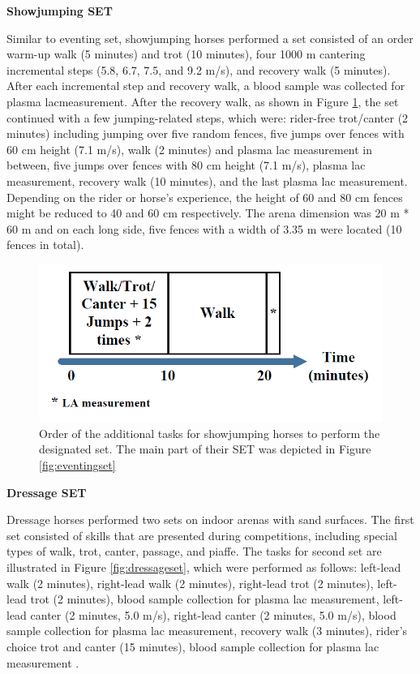 \vspace{5pt}
{\noindent\textbf{Showjumping SET} \par}
Similar to eventing \gls{set}, showjumping horses performed a \gls{set} consisted of an order warm-up walk (5 minutes) and trot (10 minutes), four 1000 m cantering incremental steps (5.8, 6.7, 7.5, and 9.2 m/s), and recovery walk (5 minutes). After each incremental step and recovery walk, a blood sample was collected for plasma \gls{lac}measurement. After the recovery walk, as shown in Figure \ref{fig:showjumpingset}, the \gls{set} continued with a few jumping-related steps, which were: rider-free trot/canter (2 minutes) including jumping over five random fences, five jumps over fences with 60 cm height (7.1 m/s), walk (2 minutes) and plasma \gls{lac} measurement in between, five jumps over fences with 80 cm height (7.1 m/s), plasma \gls{lac} measurement, recovery walk (10 minutes), and the last plasma \gls{lac} measurement. Depending on the rider or horse's experience, the height of 60 and 80 cm fences might be reduced to 40 and 60 cm respectively. The arena dimension was 20 m * 60 m and on each long side, five fences with a width of 3.35 m were located (10 fences in total).



\begin{figure}[!htbp]
\centering
\includegraphics[scale=0.3]{chapters/data/figures/ShowjumpingSET.png}
\caption{Order of the additional tasks for showjumping horses to perform the designated \gls{set}. The main part of their SET was depicted in Figure \ref{fig:eventingset}}
\label{fig:showjumpingset}
\end{figure}

\vspace{5pt}
{\noindent\textbf{Dressage SET} \par}
Dressage horses performed two \gls{set}s on indoor arenas with sand surfaces. The first \gls{set} consisted of skills that are presented during competitions, including special types of walk, trot, canter, passage, and piaffe. The tasks for second \gls{set} are illustrated in Figure \ref{fig:dressageset}, which were performed as follows: left-lead walk (2 minutes), right-lead walk (2 minutes), right-lead trot (2 minutes), left-lead trot (2 minutes), blood sample collection for plasma \gls{lac} measurement, left-lead canter (2 minutes, 5.0 m/s), right-lead canter (2 minutes, 5.0 m/s), blood sample collection for plasma \gls{lac} measurement, recovery walk (3 minutes), rider's choice trot and canter (15 minutes), blood sample collection for plasma \gls{lac} measurement \cite{MUNSTERS2013193}. 

